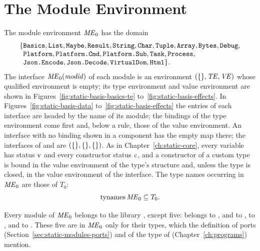 \section{The Module Environment}\label{sec:appendix-static-basis-modenv}

The module environment $\mathit{ME}_0$ has the domain
\[
\begin{array}{@{}l@{}}
  \{\kw{Basics}, \kw{List}, \kw{Maybe}, \kw{Result}, \kw{String}, \kw{Char},
    \kw{Tuple}, \kw{Array}, \kw{Bytes}, \kw{Debug},\\
  \phantom{\{}\kw{Platform}, \kw{Platform.Cmd}, \kw{Platform.Sub}, \kw{Task},
    \kw{Process},\\
  \phantom{\{}\kw{Json.Encode}, \kw{Json.Decode}, \kw{VirtualDom}, \kw{Html}\}.
\end{array}
\]
The interface $\mathit{ME}_0(\mathit{modid})$ of each module is an environment
$(\{\}, \mathit{TE}, \mathit{VE})$ whose qualified environment is empty; its type
environment and value environment are shown in
Figures~\ref{fig:static-basis-basics-te} to~\ref{fig:static-basis-effects}.
In Figures~\ref{fig:static-basis-data} to~\ref{fig:static-basis-effects} the
entries of each interface are headed by the name of its module; the bindings
of the type environment come first and, below a rule, those of the value
environment. An interface with no binding shown in a component has the empty
map there; the interfaces of  and  are $(\{\},
\{\}, \{\})$. As in Chapter~\ref{ch:static-core}, every
variable has status $\mathrm{v}$ and every constructor status $\mathrm{c}$, and a
constructor of a custom type is bound in the value environment of the
type's structure and, unless the type is closed, in the value environment of
the interface. The type names
occurring in $\mathit{ME}_0$ are those of $T_0$:
\[
  \mathrm{tynames}\, \mathit{ME}_0 \subseteq T_0 .
\]

Every module of $\mathit{ME}_0$ belongs to the library , except five:
 belongs to ,  and 
to ,  to , and
 to .
These five are in $\mathit{ME}_0$ only for their types, which the definition of ports
(Section~\ref{sec:static-modules-ports}) and of the type of 
(Chapter~\ref{ch:programs}) mention. %

